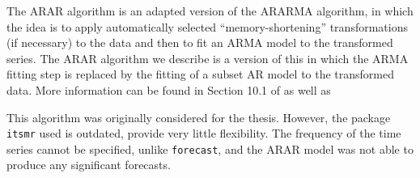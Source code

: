 \documentclass[a4paper, oneside]{discothesis}
\begin{document}
The ARAR algorithm is an adapted version of the ARARMA algorithm, in which the idea is to apply automatically selected “memory-shortening” transformations (if necessary) to the data and then to fit an ARMA model to the transformed series. The ARAR algorithm we describe is a version of this in which the ARMA fitting step is replaced by the fitting of a subset AR model to the transformed data. More information can be found in Section 10.1 of \cite{itsf} as well as \cite{ararma}

This algorithm was originally considered for the thesis. However, the package \texttt{itsmr} used is outdated, provide very little flexibility. The frequency of the time series cannot be specified, unlike \texttt{forecast}, and the ARAR model was not able to produce any significant forecasts.






\end{document}
